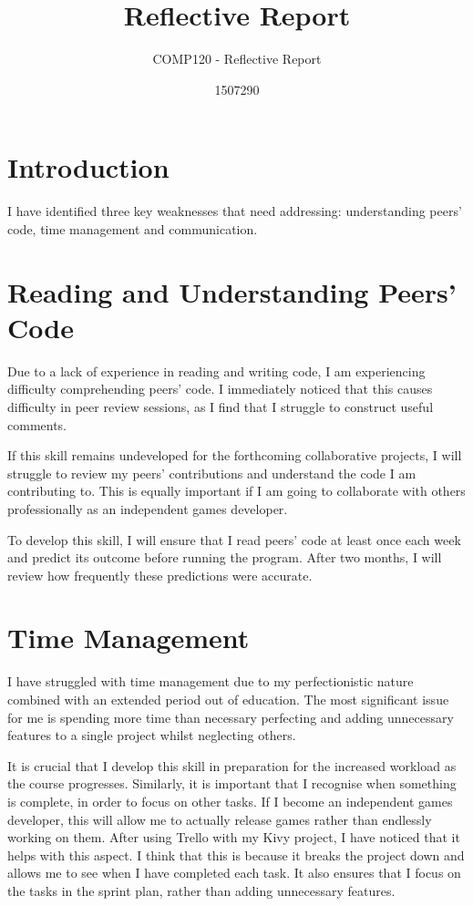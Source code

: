 \documentclass{scrartcl}
\title{Reflective Report}
\subtitle{COMP120 - Reflective Report}
\author{1507290}
\begin{document}
\maketitle

\abstract{}

\section{Introduction}
I have identified three key weaknesses that need addressing: understanding peers' code, time management and communication.

\section{Reading and Understanding Peers' Code}
Due to a lack of experience in reading and writing code, I am experiencing difficulty comprehending peers' code. I immediately noticed that this causes difficulty in peer review sessions, as I find that I struggle to construct useful comments.

If this skill remains undeveloped for the forthcoming collaborative projects, I will struggle to review my peers' contributions and understand the code I am contributing to. This is equally important if I am going to collaborate with others professionally as an independent games developer.

To develop this skill, I will ensure that I read peers' code at least once each week and predict its outcome before running the program. After two months, I will review how frequently these predictions were accurate.

\section{Time Management}
I have struggled with time management due to my perfectionistic nature combined with an extended period out of education. The most significant issue for me is spending more time than necessary perfecting and adding unnecessary features to a single project whilst neglecting others.

It is crucial that I develop this skill in preparation for the increased workload as the course progresses. Similarly, it is important that I recognise when something is complete, in order to focus on other tasks. If I become an independent games developer, this will allow me to actually release games rather than endlessly working on them. After using Trello with my Kivy project, I have noticed that it helps with this aspect. I think that this is because it breaks the project down and allows me to see when I have completed each task. It also ensures that I focus on the tasks in the sprint plan, rather than adding unnecessary features.
\end{document}
